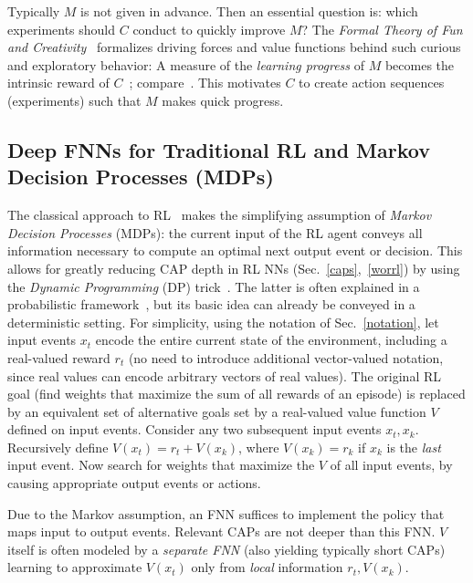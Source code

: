 \documentclass[letterpaper]{article}
\begin{document}
\begin{CJK*}{UTF8}{gbsn}
\begin{sloppypar}
Typically $M$ is not given in advance. Then 
an essential question is: which experiments should $C$ conduct to quickly improve $M$?
The {\em Formal Theory of Fun and Creativity}~\citep[e.g.,][]{Schmidhuber:06cs,Schmidhuber:13powerplay}
 formalizes driving forces and value functions behind such curious and exploratory behavior: 
A measure of the {\em learning progress} of $M$ becomes the intrinsic reward of $C$~\citep{Schmidhuber:91singaporecur}; compare~\citep{Singh:05nips,Oudeyer:12intrinsic}.
This motivates $C$ to create action sequences (experiments) such that $M$ makes quick progress.



\subsection{Deep FNNs for Traditional RL and Markov Decision Processes (MDPs)}
\label{trarl}

The classical
approach to RL~\citep{Samuel:59,Bertsekas:96} makes the simplifying 
assumption of {\em Markov Decision Processes} (MDPs): 
the current input of the RL agent
conveys all information necessary to compute an optimal next 
output event or decision. 
This allows for greatly reducing CAP depth in RL NNs (Sec.~\ref{caps},~\ref{worrl}) 
by using the {\em Dynamic Programming} (DP) trick~\citep{Bellman:1957}.
The latter is often explained in a probabilistic framework~\citep[e.g.,][]{Sutton:98}, 
but its basic idea can already be conveyed in a deterministic setting.
For simplicity, 
using the notation of Sec.~\ref{notation},
let input events $x_t$ encode the entire current state of
the environment, including a real-valued reward $r_t$
(no need to introduce additional vector-valued notation, 
since real values can encode arbitrary vectors of real values).
The original RL goal (find weights that maximize the sum of all rewards of an episode) 
is replaced by an equivalent set of alternative goals set by a
real-valued value function $V$ defined on input events.
Consider any two subsequent input events $x_t,x_k$.
Recursively define $V(x_t)=r_t+V(x_k)$, where $V(x_k)=r_k$ if $x_k$ is the {\em last} input event.
Now search for weights that maximize the $V$ 
of all input events, 
by causing appropriate output events or actions. 

Due to the Markov assumption,
an FNN suffices to implement the policy that maps input to output events.
Relevant CAPs are not deeper than this FNN. 
$V$ itself is often modeled by a {\em separate FNN} (also yielding typically short CAPs) 
learning to approximate $V(x_t)$ 
only from {\em local} information $r_t, V(x_k)$.


\end{sloppypar}
\end{CJK*}
\end{document}
